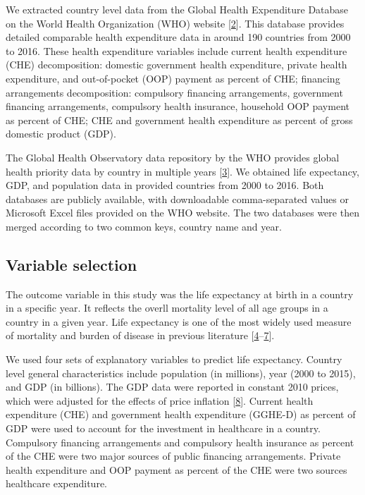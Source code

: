 \documentclass[]{elsarticle} %
\begin{document}
We extracted country level data from the Global Health Expenditure Database on the World Health Organization (WHO) website {[}\protect\hyperlink{ref-WHOdata}{2}{]}.
This database provides detailed comparable health expenditure data in around 190 countries from 2000 to 2016.
These health expenditure variables include current health expenditure (CHE) decomposition: domestic government health expenditure, private health expenditure, and out-of-pocket (OOP) payment as percent of CHE;
financing arrangements decomposition: compulsory financing arrangements, government financing arrangements, compulsory health insurance, household OOP payment as percent of CHE; CHE and government health expenditure as percent of gross domestic product (GDP).

The Global Health Observatory data repository by the WHO provides global health priority data by country in multiple years {[}\protect\hyperlink{ref-worldbank}{3}{]}.
We obtained life expectancy, GDP, and population data in provided countries from 2000 to 2016.
Both databases are publicly available, with downloadable comma-separated values or Microsoft Excel files provided on the WHO website.
The two databases were then merged according to two common keys, country name and year.

\hypertarget{variable-selection}{%
\subsection{Variable selection}\label{variable-selection}}

The outcome variable in this study was the life expectancy at birth in a country in a specific year.
It reflects the overll mortality level of all age groups in a country in a given year.
Life expectancy is one of the most widely used measure of mortality and burden of disease in previous literature {[}\protect\hyperlink{ref-lee2012effect}{4}--\protect\hyperlink{ref-mathers2015causes}{7}{]}.

We used four sets of explanatory variables to predict life expectancy.
Country level general characteristics include population (in millions), year (2000 to 2015), and GDP (in billions).
The GDP data were reported in constant 2010 prices, which were adjusted for the effects of price inflation {[}\protect\hyperlink{ref-worldbankconstant}{8}{]}.
Current health expenditure (CHE) and government health expenditure (GGHE-D) as percent of GDP were used to account for the investment in healthcare in a country.
Compulsory financing arrangements and compulsory health insurance as percent of the CHE were two major sources of public financing arrangements.
Private health expenditure and OOP payment as percent of the CHE were two sources healthcare expenditure.
\end{document}
